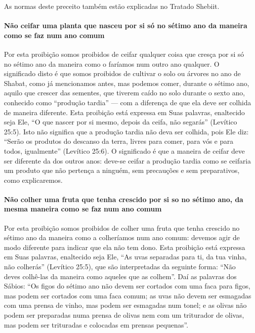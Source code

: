 As normas deste preceito também estão explicadas no Tratado Shebiit.

\paragraph{Não ceifar uma planta que nasceu por si só no sétimo ano da maneira
como se faz num ano comum}

Por esta proibição somos proibidos de ceifar qualquer coisa que cresça
por si só no sétimo ano da maneira como o faríamos num outro ano
qualquer. O significado disto é que somos proibidos de cultivar o solo
ou árvores no ano de Shabat, como já mencionamos antes, mas podemos
comer, durante o sétimo ano, aquilo que crescer das sementes, que
tiverem caído no solo durante o sexto ano, conhecido como ``produção
tardia'' --- com a diferença de que ela deve ser colhida de maneira
diferente. Esta proibição está expressa em Suas palavras, enaltecido
seja Ele, ``O que nascer por si mesmo, depois da ceifa, não segarás''
(Levítico 25:5). Isto não significa que a produção tardia não deva ser
colhida, pois Ele diz: ``Serão os produtos do descanso da terra, livres
para comer, para vós e para todos, igualmente'' (Levítico 25:6). O
significado é que a maneira de ceifar deve ser diferente da dos outros
anos: deve-se ceifar a produção tardia como se ceifaria um produto que
não pertença a ninguém, sem precauções e sem preparativos, como
explicaremos.

\paragraph{Não colher uma fruta que tenha crescido por si so no sétimo ano, da
mesma maneira como se faz num ano comum}

Por esta proibição somos proibidos de colher uma fruta que tenha
crescido no sétimo ano da maneira como a colheríamos num ano comum: devemos agir de modo diferente para indicar que ela não tem dono. Esta
proibição está expressa em Suas palavras, enaltecido seja Ele, ``As
uvas separadas para ti, da tua vinha, não colherás'' (Levítico 25:5),
que são interpretadas da seguinte forma: ``Não deves colhê-las da
maneira como aqueles que as colhem''. Daí as palavras dos Sábios: ``Os
figos do sétimo ano não devem ser cortados com uma faca para figos, mas
podem ser cortados com uma faca comum; as uvas não devem ser esmagadas
com uma prensa de vinho, mas podem ser esmagadas num tonel; e as olivas
não podem ser preparadas numa prensa de olivas nem com um triturador de
olivas, mas podem ser trituradas e colocadas em prensas pequenas''.

